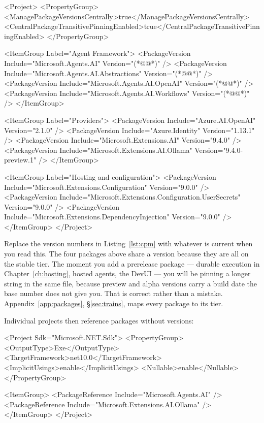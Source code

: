 \begin{xmlcode}[caption={\code{Directory.Packages.props} --- the only place versions are written}, label={lst:cpm}, escapeinside={(*@}{@*)}]
<Project>
  <PropertyGroup>
    <ManagePackageVersionsCentrally>true</ManagePackageVersionsCentrally>
    <CentralPackageTransitivePinningEnabled>true</CentralPackageTransitivePinningEnabled>
  </PropertyGroup>

  <ItemGroup Label="Agent Framework">
    <PackageVersion Include="Microsoft.Agents.AI" Version="(*@\mafcore{}@*)" />
    <PackageVersion Include="Microsoft.Agents.AI.Abstractions" Version="(*@\mafcore{}@*)" />
    <PackageVersion Include="Microsoft.Agents.AI.OpenAI" Version="(*@\mafcore{}@*)" />
    <PackageVersion Include="Microsoft.Agents.AI.Workflows" Version="(*@\mafcore{}@*)" />
  </ItemGroup>

  <ItemGroup Label="Providers">
    <PackageVersion Include="Azure.AI.OpenAI" Version="2.1.0" />
    <PackageVersion Include="Azure.Identity" Version="1.13.1" />
    <PackageVersion Include="Microsoft.Extensions.AI" Version="9.4.0" />
    <PackageVersion Include="Microsoft.Extensions.AI.Ollama" Version="9.4.0-preview.1" />
  </ItemGroup>

  <ItemGroup Label="Hosting and configuration">
    <PackageVersion Include="Microsoft.Extensions.Configuration" Version="9.0.0" />
    <PackageVersion Include="Microsoft.Extensions.Configuration.UserSecrets" Version="9.0.0" />
    <PackageVersion Include="Microsoft.Extensions.DependencyInjection" Version="9.0.0" />
  </ItemGroup>
</Project>
\end{xmlcode}

\begin{versionbox}
Replace the version numbers in Listing~\ref{lst:cpm} with whatever is current
when you read this. The four packages above share a version because they are all
on the stable tier. The moment you add a prerelease package --- durable execution
in Chapter~\ref{ch:hosting}, hosted agents, the DevUI --- you will be pinning a
longer string in the same file, because preview and alpha versions carry a build
date the base number does not give you. That is correct rather than a mistake.
Appendix~\ref{app:packages}, \S\ref{sec:trains}, maps every package to its tier.
\end{versionbox}

Individual projects then reference packages without versions:

\begin{xmlcode}[caption={\code{HelloAgent.csproj} --- no version numbers anywhere}, label={lst:csproj}]
<Project Sdk="Microsoft.NET.Sdk">
  <PropertyGroup>
    <OutputType>Exe</OutputType>
    <TargetFramework>net10.0</TargetFramework>
    <ImplicitUsings>enable</ImplicitUsings>
    <Nullable>enable</Nullable>
  </PropertyGroup>

  <ItemGroup>
    <PackageReference Include="Microsoft.Agents.AI" />
    <PackageReference Include="Microsoft.Extensions.AI.Ollama" />
  </ItemGroup>
</Project>
\end{xmlcode}

